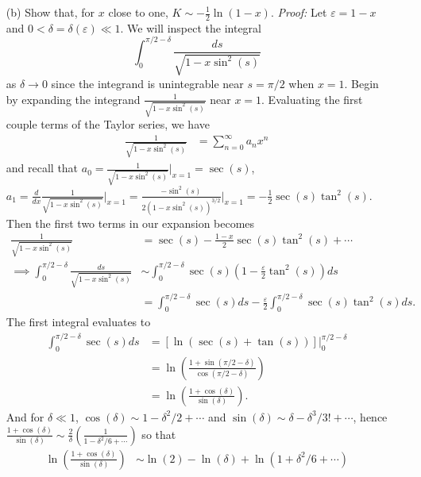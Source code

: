 \documentclass{article}
\begin{document}
\begin{itemize}
\begin{itemize}
        \item[(b)] Show that, for $x$ close to one, $K \sim -\frac{1}{2}\ln(1 - x).$
        \newline\newline
        \textit{Proof:} Let $\varepsilon = 1 - x$ and $0 < \delta = \delta(\varepsilon) \ll 1$. We will inspect the integral 
        \[\int_0^{\pi/2 - \delta} \frac{ds}{\sqrt{1 - x\sin^2(s)}}\]
        as $\delta \to 0$ since the integrand is unintegrable near $s = \pi/2$ when $x = 1$. Begin by expanding the integrand $\frac{1}{\sqrt{1 - x\sin^2(s)}}$ near $x = 1$. Evaluating the first couple terms of the Taylor series, we have
        \begin{align*}
            \frac{1}{\sqrt{1 - x\sin^2(s)}} &= \sum_{n = 0}^{\infty} a_nx^n
        \end{align*}
        and recall that $a_0 = \frac{1}{\sqrt{1 - x\sin^2(s)}}\bigg|_{x = 1} = \sec(s)$, $a_1 = \frac{d}{dx}\frac{1}{\sqrt{1 - x\sin^2(s)}}\bigg|_{x = 1} = \frac{-\sin^2(s)}{2(1 - x\sin^2(s))^{3/2}}\bigg|_{x = 1} = -\frac{1}{2}\sec(s)\tan^2(s)$. Then the first two terms in our expansion becomes
        \begin{align*}
            \frac{1}{\sqrt{1 - x\sin^2(s)}} &= \sec(s) - \frac{1-x}{2}\sec(s)\tan^2(s) + \cdots\\
            \implies \int_0^{\pi/2 - \delta}\frac{ds}{\sqrt{1 - x\sin^2(s)}} &\sim \int_0^{\pi/2-\delta}\sec(s)\left(1 - \frac{\varepsilon}{2}\tan^2(s)\right)ds\\
            &= \int_0^{\pi/2 - \delta}\sec(s)ds - \frac{\varepsilon}{2}\int_0^{\pi/2 - \delta} \sec(s)\tan^2(s)ds.
        \end{align*}
        The first integral evaluates to 
        \begin{align*}
            \int_0^{\pi/2 - \delta}\sec(s)ds &= \left[\ln(\sec(s) + \tan(s))\right]\bigg|_0^{\pi/2 - \delta}\\
            &= \ln\left(\frac{1 + \sin(\pi/2 - \delta)}{\cos(\pi/2 - \delta)}\right)\\
            &= \ln\left(\frac{1 + \cos(\delta)}{\sin(\delta)}\right).
        \end{align*}
        And for $\delta \ll 1$, $\cos(\delta) \sim 1 - \delta^2/2 + \cdots$ and $\sin(\delta) \sim \delta - \delta^3/3! + \cdots$, hence $\frac{1 + \cos(\delta)}{\sin(\delta)} \sim \frac{2}{\delta}\left(\frac{1}{1 - \delta^2/6 + \cdots}\right)$ so that
        \begin{align*}
            \ln\left(\frac{1 + \cos(\delta)}{\sin(\delta)}\right) &\sim \ln(2) - \ln(\delta) + \ln(1 + \delta^2/6 + \cdots)\\

\end{align*}
\end{itemize}
\end{itemize}
\end{document}
